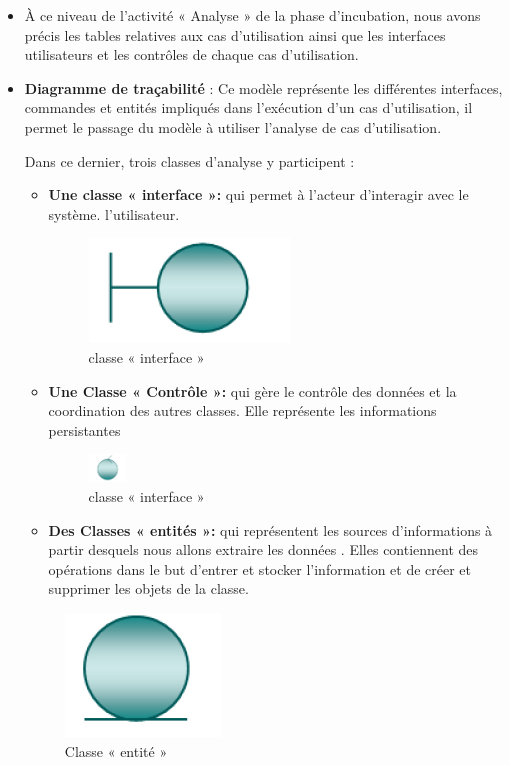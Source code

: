 \documentclass[12 pt ]{report}
\begin{document}
\begin{itemize}[font=\color{black} \Large, label=]
\item À ce niveau de l’activité « Analyse » de la phase d’incubation, nous avons précis les tables relatives aux cas d’utilisation ainsi que les interfaces utilisateurs et les contrôles de chaque cas d’utilisation.
\item \textbf{ Diagramme de traçabilité} : Ce modèle représente les différentes interfaces,
commandes et entités impliqués dans l'exécution d'un cas d'utilisation, il permet le
passage du modèle à utiliser l'analyse de cas d’utilisation.


 Dans ce
dernier, trois classes d’analyse y participent :
\begin{itemize}[font=\color{black} \Large, label=]
\item \textbf{Une classe « interface »:}
 qui permet à
l’acteur d’interagir avec le
système. 
l’utilisateur.

\begin{figure}[h]
 \begin{center}
\includegraphics[width= 1 cm ,height= 1 cm]{int.png}
\caption{ classe « interface »}
\end{center}
\end{figure}


\item \textbf{Une Classe « Contrôle »:}
qui gère le contrôle des données
et la coordination des autres
classes. Elle représente les informations persistantes
\begin{figure}[h]
 \begin{center}
\includegraphics[width= 1cm ,height= 1 cm]{cntrl.png}
\caption{ classe « interface »}
\end{center}
\end{figure}

\item \textbf{Des Classes « entités »:}
qui
représentent les sources
d’informations à partir
desquels nous allons extraire
les données . Elles contiennent
des opérations dans le but d’entrer et stocker
l’information et de créer et
supprimer les objets de la
classe.
\end{itemize}
\begin{figure}[h]
 \begin{center}
\includegraphics[width= 1 cm ,height= 1 cm]{entite.png}
\caption{ Classe « entité »}
\end{center}
\end{figure}

\end{itemize}
\end{document}
